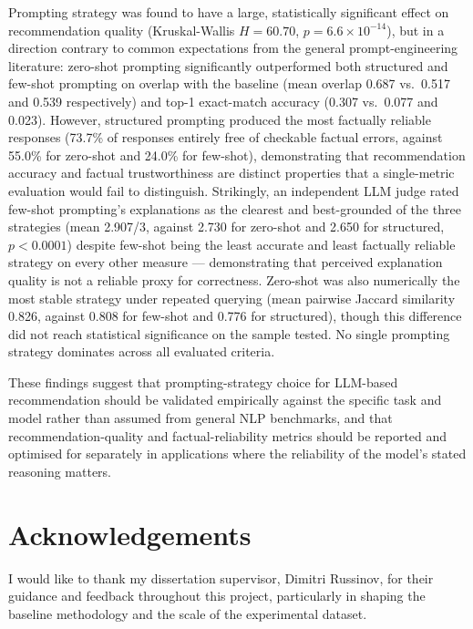 Prompting strategy was found to have a large, statistically significant effect on recommendation quality (Kruskal-Wallis $H=60.70$, $p=6.6\times10^{-14}$), but in a direction contrary to common expectations from the general prompt-engineering literature: zero-shot prompting significantly outperformed both structured and few-shot prompting on overlap with the baseline (mean overlap 0.687 vs.\ 0.517 and 0.539 respectively) and top-1 exact-match accuracy (0.307 vs.\ 0.077 and 0.023). However, structured prompting produced the most factually reliable responses (73.7\% of responses entirely free of checkable factual errors, against 55.0\% for zero-shot and 24.0\% for few-shot), demonstrating that recommendation accuracy and factual trustworthiness are distinct properties that a single-metric evaluation would fail to distinguish. Strikingly, an independent LLM judge rated few-shot prompting's explanations as the clearest and best-grounded of the three strategies (mean 2.907/3, against 2.730 for zero-shot and 2.650 for structured, $p < 0.0001$) despite few-shot being the least accurate and least factually reliable strategy on every other measure --- demonstrating that perceived explanation quality is not a reliable proxy for correctness. Zero-shot was also numerically the most stable strategy under repeated querying (mean pairwise Jaccard similarity 0.826, against 0.808 for few-shot and 0.776 for structured), though this difference did not reach statistical significance on the sample tested. No single prompting strategy dominates across all evaluated criteria.

These findings suggest that prompting-strategy choice for LLM-based recommendation should be validated empirically against the specific task and model rather than assumed from general NLP benchmarks, and that recommendation-quality and factual-reliability metrics should be reported and optimised for separately in applications where the reliability of the model's stated reasoning matters.

\chapter*{Acknowledgements}

I would like to thank my dissertation supervisor, Dimitri Russinov, for their guidance and feedback throughout this project, particularly in shaping the baseline methodology and the scale of the experimental dataset.

